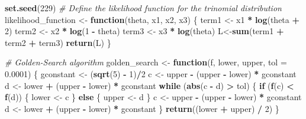 \documentclass[
]{article}
\newenvironment{Shaded}{\begin{snugshade}}{\end{snugshade}}
\newcommand{\AttributeTok}[1]{\textcolor[rgb]{0.13,0.29,0.53}{#1}}
\newcommand{\CommentTok}[1]{\textcolor[rgb]{0.56,0.35,0.01}{\textit{#1}}}
\newcommand{\ControlFlowTok}[1]{\textcolor[rgb]{0.13,0.29,0.53}{\textbf{#1}}}
\newcommand{\DecValTok}[1]{\textcolor[rgb]{0.00,0.00,0.81}{#1}}
\newcommand{\FloatTok}[1]{\textcolor[rgb]{0.00,0.00,0.81}{#1}}
\newcommand{\FunctionTok}[1]{\textcolor[rgb]{0.13,0.29,0.53}{\textbf{#1}}}
\newcommand{\NormalTok}[1]{#1}
\newcommand{\OtherTok}[1]{\textcolor[rgb]{0.56,0.35,0.01}{#1}}
\newcommand{\SpecialCharTok}[1]{\textcolor[rgb]{0.81,0.36,0.00}{\textbf{#1}}}
\begin{document}
\begin{Shaded}
\begin{Highlighting}[]
\FunctionTok{set.seed}\NormalTok{(}\DecValTok{229}\NormalTok{)}
\CommentTok{\# Define the likelihood function for the trinomial distribution}
\NormalTok{likelihood\_function }\OtherTok{\textless{}{-}} \ControlFlowTok{function}\NormalTok{(theta, x1, x2, x3) \{}
\NormalTok{  term1 }\OtherTok{\textless{}{-}}\NormalTok{ x1 }\SpecialCharTok{*} \FunctionTok{log}\NormalTok{(theta }\SpecialCharTok{+} \DecValTok{2}\NormalTok{)}
\NormalTok{  term2 }\OtherTok{\textless{}{-}}\NormalTok{ x2 }\SpecialCharTok{*} \FunctionTok{log}\NormalTok{(}\DecValTok{1} \SpecialCharTok{{-}}\NormalTok{ theta)}
\NormalTok{  term3 }\OtherTok{\textless{}{-}}\NormalTok{ x3 }\SpecialCharTok{*} \FunctionTok{log}\NormalTok{(theta)}
\NormalTok{  L}\OtherTok{\textless{}{-}}\FunctionTok{sum}\NormalTok{(term1 }\SpecialCharTok{+}\NormalTok{ term2 }\SpecialCharTok{+}\NormalTok{ term3)}
  \FunctionTok{return}\NormalTok{(L)}
\NormalTok{\}}

\CommentTok{\# Golden{-}Search algorithm}
\NormalTok{golden\_search }\OtherTok{\textless{}{-}} \ControlFlowTok{function}\NormalTok{(f, lower, upper, }\AttributeTok{tol =} \FloatTok{0.0001}\NormalTok{) \{}
\NormalTok{  gconstant }\OtherTok{\textless{}{-}}\NormalTok{   (}\FunctionTok{sqrt}\NormalTok{(}\DecValTok{5}\NormalTok{) }\SpecialCharTok{{-}} \DecValTok{1}\NormalTok{)}\SpecialCharTok{/}\DecValTok{2} 
\NormalTok{  c }\OtherTok{\textless{}{-}}\NormalTok{ upper }\SpecialCharTok{{-}}\NormalTok{ (upper }\SpecialCharTok{{-}}\NormalTok{ lower) }\SpecialCharTok{*}\NormalTok{ gconstant}
\NormalTok{  d }\OtherTok{\textless{}{-}}\NormalTok{ lower }\SpecialCharTok{+}\NormalTok{ (upper }\SpecialCharTok{{-}}\NormalTok{ lower) }\SpecialCharTok{*}\NormalTok{ gconstant}
  \ControlFlowTok{while}\NormalTok{ (}\FunctionTok{abs}\NormalTok{(c }\SpecialCharTok{{-}}\NormalTok{ d) }\SpecialCharTok{\textgreater{}}\NormalTok{ tol) \{}
    \ControlFlowTok{if}\NormalTok{ (}\FunctionTok{f}\NormalTok{(c) }\SpecialCharTok{\textless{}} \FunctionTok{f}\NormalTok{(d)) \{}
\NormalTok{      lower }\OtherTok{\textless{}{-}}\NormalTok{ c}
\NormalTok{    \} }\ControlFlowTok{else}\NormalTok{ \{}
\NormalTok{      upper }\OtherTok{\textless{}{-}}\NormalTok{ d}
\NormalTok{    \}}
\NormalTok{    c }\OtherTok{\textless{}{-}}\NormalTok{ upper }\SpecialCharTok{{-}}\NormalTok{ (upper }\SpecialCharTok{{-}}\NormalTok{ lower) }\SpecialCharTok{*}\NormalTok{ gconstant}
\NormalTok{    d }\OtherTok{\textless{}{-}}\NormalTok{ lower }\SpecialCharTok{+}\NormalTok{ (upper }\SpecialCharTok{{-}}\NormalTok{ lower) }\SpecialCharTok{*}\NormalTok{ gconstant}
\NormalTok{  \}}
  \FunctionTok{return}\NormalTok{((lower }\SpecialCharTok{+}\NormalTok{ upper) }\SpecialCharTok{/} \DecValTok{2}\NormalTok{)}
\NormalTok{\}}


\end{Highlighting}
\end{Shaded}
\end{document}
